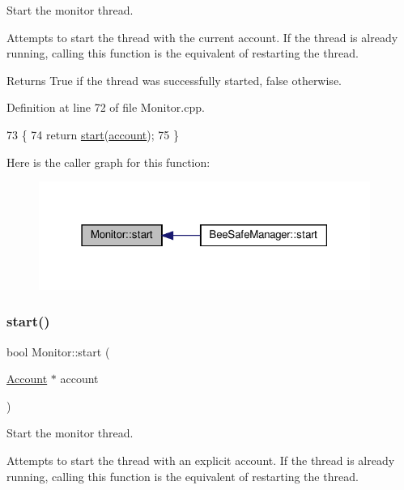 Start the monitor thread.

Attempts to start the thread with the current account. If the thread is already running, calling this function is the equivalent of restarting the thread.

\begin{DoxyReturn}{Returns}
True if the thread was successfully started, false otherwise. 
\end{DoxyReturn}


Definition at line 72 of file Monitor.\+cpp.


\begin{DoxyCode}
73 \{
74     \textcolor{keywordflow}{return} \hyperlink{class_monitor_a71dfa92dfa25ee137f4e3d5e01a8d673}{start}(\hyperlink{class_monitor_acacff99178fbcd9eae50801acc346bf4}{account});
75 \}
\end{DoxyCode}
Here is the caller graph for this function\+:
\nopagebreak
\begin{figure}[H]
\begin{center}
\leavevmode
\includegraphics[width=307pt]{d9/df7/class_monitor_a71dfa92dfa25ee137f4e3d5e01a8d673_icgraph}
\end{center}
\end{figure}
\mbox{\label{class_monitor_a5a01b1c1084f0826a01c184519491cf6}} 
\subsubsection{\texorpdfstring{start()}{start()}\hspace{0.1cm}{\footnotesize\ttfamily [2/2]}}
{\footnotesize\ttfamily bool Monitor\+::start (\begin{DoxyParamCaption}\item[{\hyperlink{class_account}{Account} $\ast$}]{account }\end{DoxyParamCaption})}

Start the monitor thread.

Attempts to start the thread with an explicit account. If the thread is already running, calling this function is the equivalent of restarting the thread.


